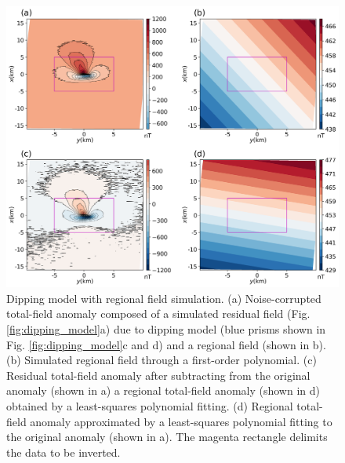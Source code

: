 \begin{figure}
    \centering
    \includegraphics[width=\linewidth]{figures/regional-data-large.png}
    \caption{Dipping model with regional field simulation. (a) Noise-corrupted total-field anomaly composed of a simulated residual field (Fig. \ref{fig:dipping_model}a) due to 
dipping model (blue prisms shown in Fig. \ref{fig:dipping_model}c and d) and a regional field (shown in b). (b) Simulated regional field through a first-order polynomial. 
(c) Residual total-field anomaly after subtracting from the original anomaly (shown in a) a
regional total-field anomaly (shown in d) obtained by a least-squares polynomial fitting. 
(d)  Regional total-field anomaly approximated by a least-squares polynomial fitting to the original anomaly (shown in a). The magenta rectangle delimits the data to be inverted.
}
    \label{fig:dipping_regional_model}
\end{figure}


